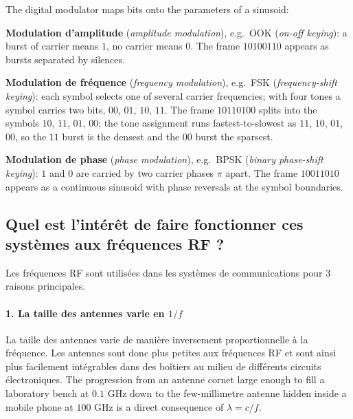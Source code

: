 \begin{example}
  The digital modulator maps bits onto the parameters of a sinusoid:
  \begin{subpart}
    \item \textbf{Modulation d'amplitude} (\textit{amplitude modulation}), e.g.\
      OOK (\textit{on-off keying}):
      a burst of carrier means $1$, no carrier means $0$. The frame
      $10100110$ appears as bursts separated by silences.
    \item \textbf{Modulation de fréquence} (\textit{frequency modulation}),
      e.g.\ FSK (\textit{frequency-shift
      keying}): each symbol selects one of several carrier frequencies; with
      four tones a symbol carries two bits, $00$, $01$, $10$, $11$. The frame
      $10110100$ splits into the symbols $10$, $11$, $01$, $00$; the tone
      assignment runs fastest-to-slowest as $11$, $10$, $01$, $00$, so the $11$
      burst is the densest and the $00$ burst the sparsest.
    \item \textbf{Modulation de phase} (\textit{phase modulation}), e.g.\ BPSK
      (\textit{binary phase-shift
      keying}): $1$ and $0$ are carried by two carrier phases $\pi$ apart. The
      frame $10011010$ appears as a continuous sinusoid with phase reversals at
      the symbol boundaries.
  \end{subpart}
\end{example}

\subsection{Quel est l'intérêt de faire fonctionner ces systèmes aux fréquences RF ?}
Les fréquences RF sont utilisées dans les systèmes de communications pour
3 raisons principales.

\paragraph{1. La taille des antennes varie en $1/f$}
La taille des antennes varie de manière inversement proportionnelle à la
fréquence. Les antennes sont donc plus petites aux fréquences RF et sont ainsi
plus facilement intégrables dans des boîtiers au milieu de différents circuits
électroniques. The progression from an antenne cornet large enough to fill a
laboratory bench at $0.1$ GHz down to the few-millimetre antenne hidden inside
a mobile phone at $100$ GHz is a direct consequence of $\lambda=c/f$.


